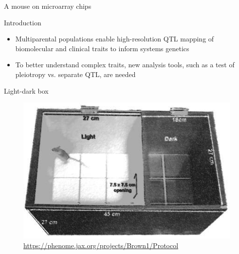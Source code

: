 \documentclass[final,hyperref={pdfpagelabels=false}]{beamer}
\begin{document}
\begin{frame}[t]
\begin{columns}[t]
\begin{column}{.465\textwidth}
\begin{block}{A mouse on microarray chips}
\end{block}




            
\begin{block}{Introduction}

\begin{itemize}
\item Multiparental populations enable high-resolution QTL mapping of biomolecular and clinical traits to inform systems genetics   
\item To better understand complex traits, new analysis tools, such as a test of pleiotropy vs. separate QTL, are needed 
\end{itemize}

\end{block}





\begin{block}{Light-dark box}

\begin{figure}
\includegraphics[width=0.5\linewidth]{lightdarkbox.jpg}
\caption{\href{https://phenome.jax.org/projects/Brown1/Protocol}{https://phenome.jax.org/projects/Brown1/Protocol}
}
\end{figure}


\end{block}
\end{column}
\end{columns}
\end{frame}
\end{document}
